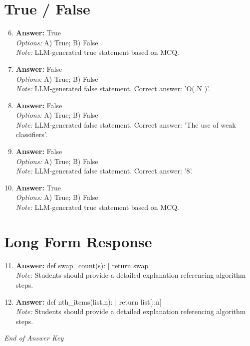 \documentclass[12pt]{article}
\begin{document}
\section*{True / False}
\begin{enumerate}[label=\arabic*.]
\setcounter{enumi}{5}
\item \textbf{Answer:} True
\\ \textit{Options:} A) True; B) False
\\ \textit{Note:} LLM-generated true statement based on MCQ.
\item \textbf{Answer:} False
\\ \textit{Options:} A) True; B) False
\\ \textit{Note:} LLM-generated false statement. Correct answer: 'O( N )'.
\item \textbf{Answer:} False
\\ \textit{Options:} A) True; B) False
\\ \textit{Note:} LLM-generated false statement. Correct answer: 'The use of weak classifiers'.
\item \textbf{Answer:} False
\\ \textit{Options:} A) True; B) False
\\ \textit{Note:} LLM-generated false statement. Correct answer: '8'.
\item \textbf{Answer:} True
\\ \textit{Options:} A) True; B) False
\\ \textit{Note:} LLM-generated true statement based on MCQ.
\end{enumerate}

\section*{Long Form Response}
\begin{enumerate}[label=\arabic*.]
\setcounter{enumi}{10}
\item \textbf{Answer:} def swap\_count(s): | return swap
\\ \textit{Note:} Students should provide a detailed explanation referencing algorithm steps.
\item \textbf{Answer:} def nth\_items(list,n): | return list[::n]
\\ \textit{Note:} Students should provide a detailed explanation referencing algorithm steps.
\end{enumerate}

\vfill
\noindent\textit{End of Answer Key}
\end{document}
